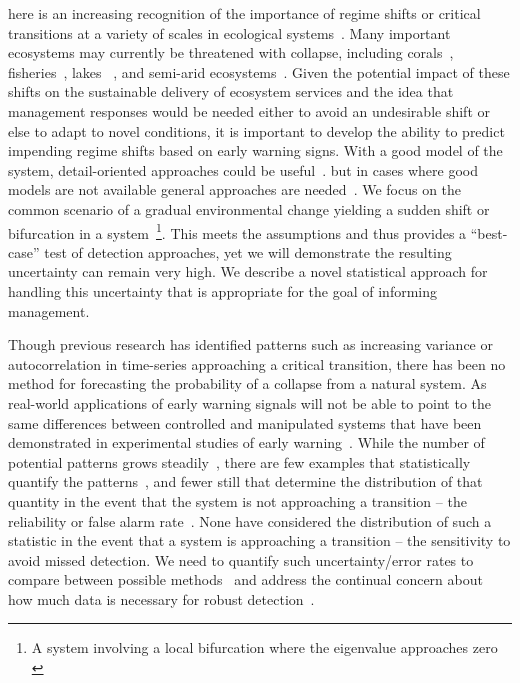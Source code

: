 \documentclass{pnastwo}
\begin{document}
\begin{article}
here is an increasing recognition of the importance of regime shifts or critical transitions at a variety of scales in ecological systems~\cite{Holling1973, Wissel1984, Scheffer2001, Scheffer2009, Drake2010, Carpenter2011}⁠. 
Many important ecosystems may currently be threatened with collapse, including corals~\cite{Bellwood2004}, fisheries~\cite{Berkes2006}⁠, lakes~\cite{Carpenter2011} , and semi-arid ecosystems~\cite{Kefi2007}⁠. 
Given the potential impact of  these shifts on the sustainable delivery of ecosystem services
and the idea that management responses would be needed either to avoid an undesirable shift or else to adapt to novel conditions,
it is important to develop the ability to predict impending regime shifts based on early warning signs. 
With a good model of the system, detail-oriented approaches could be useful~\cite{Lenton2009}.
but in cases where good models are not available general approaches are needed~\cite{Scheffer2009}⁠.
We focus on the common scenario of a gradual environmental change yielding a sudden shift or bifurcation in a system~\footnote{A system involving a local bifurcation where the eigenvalue approaches zero \cite{Scheffer2001, Scheffer2009}}.  
This meets the assumptions and thus provides a ``best-case'' test of detection approaches,
yet we will demonstrate the resulting uncertainty can remain very high.
We describe a novel statistical approach for handling this uncertainty that is appropriate for the goal of informing management.  

Though previous research has identified patterns such as increasing variance or autocorrelation in time-series approaching a critical transition,
there has been no method for forecasting the probability of a collapse from a natural system.
As real-world applications of early warning signals will not be able to point to the same differences between controlled and
manipulated systems that have been demonstrated in experimental studies of early warning~\cite{Drake2010, Carpenter2011}⁠.
While the number of potential patterns grows steadily~\cite{Carpenter2006, Dakos2008, Guttal2008, Guttal2008a, Dakos2011}, %
there are few examples that statistically quantify the patterns~\cite{Dakos2008, Dakos2011},⁠
and fewer still that determine the distribution of that quantity in the event that the system is not approaching a transition --
the reliability or false alarm rate~\cite{Dakos2008}⁠. 
None have considered the distribution of such a statistic in the event that a system is approaching a transition -- 
the sensitivity to avoid missed detection.  
We need to quantify such uncertainty/error rates to compare between possible methods~\cite{Contamin2009}
and address the continual concern about how much data is necessary⁠ for robust detection~\cite{Scheffer2001, Dakos2008, Carpenter2011, Scheffer2010, Inman2011}.  


\end{article}
\end{document}
